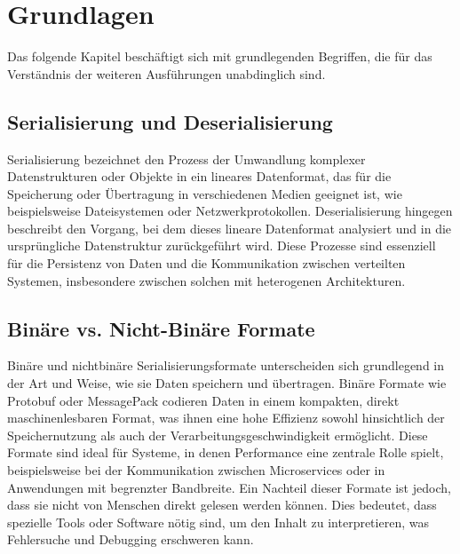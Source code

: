 \documentclass[ngerman]{seminarvorlage}
\begin{document}
\section{Grundlagen}

Das folgende Kapitel beschäftigt sich mit grundlegenden Begriffen, die für das Verständnis der weiteren Ausführungen unabdinglich sind.

\subsection{Serialisierung und Deserialisierung}
Serialisierung bezeichnet den Prozess der Umwandlung komplexer Datenstrukturen oder Objekte in ein lineares Datenformat, das für die Speicherung oder Übertragung in verschiedenen Medien geeignet ist, wie beispielsweise Dateisystemen oder Netzwerkprotokollen. Deserialisierung hingegen beschreibt den Vorgang, bei dem dieses lineare Datenformat analysiert und in die ursprüngliche Datenstruktur zurückgeführt wird. Diese Prozesse sind essenziell für die Persistenz von Daten und die Kommunikation zwischen verteilten Systemen, insbesondere zwischen solchen mit heterogenen Architekturen.

\subsection{Binäre vs. Nicht-Binäre Formate}
Binäre und nichtbinäre Serialisierungsformate unterscheiden sich grundlegend in der Art und Weise, wie sie Daten speichern und übertragen. Binäre Formate wie Protobuf oder MessagePack codieren Daten in einem kompakten, direkt maschinenlesbaren Format, was ihnen eine hohe Effizienz sowohl hinsichtlich der Speichernutzung als auch der Verarbeitungsgeschwindigkeit ermöglicht. Diese Formate sind ideal für Systeme, in denen Performance eine zentrale Rolle spielt, beispielsweise bei der Kommunikation zwischen Microservices oder in Anwendungen mit begrenzter Bandbreite. Ein Nachteil dieser Formate ist jedoch, dass sie nicht von Menschen direkt gelesen werden können. Dies bedeutet, dass spezielle Tools oder Software nötig sind, um den Inhalt zu interpretieren, was Fehlersuche und Debugging erschweren kann.
\end{document}
